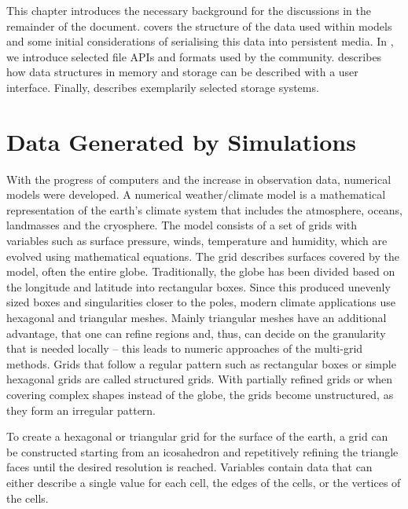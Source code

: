 \begin{chapterIntro}
This chapter introduces the necessary background for the discussions in the remainder of the document.
 covers the structure of the data used within models and some initial considerations of serialising this data into persistent media.
In , we introduce selected file APIs and formats used by the community.
 describes how data structures in memory and storage can be described with a user interface. %
Finally,  describes exemplarily selected storage systems.
\end{chapterIntro}


\section{Data Generated by Simulations}
\label{sec: Data Generated by Simulations}

With the progress of computers and the increase in observation data, numerical models were developed.
A numerical weather/climate model is a mathematical representation of the earth's climate system that includes the atmosphere, oceans, landmasses and the cryosphere.
The model consists of a set of grids with variables such as surface pressure, winds, temperature and humidity, which are evolved using mathematical equations.
The grid describes surfaces covered by the model,  often the entire globe.
Traditionally, the globe has been divided based on the longitude and latitude into rectangular boxes.
Since this produced unevenly sized boxes and singularities closer to the poles, modern climate applications use hexagonal and triangular meshes.
Mainly triangular meshes have an additional advantage, that one can refine regions and, thus, can decide on the granularity that is needed locally -- this leads to numeric approaches of the multi-grid methods.
Grids that follow a regular pattern such as rectangular boxes or simple hexagonal grids are called structured grids.
With partially refined grids or when covering complex shapes instead of the globe, the grids become unstructured, as they form an irregular pattern.

To create a hexagonal or triangular grid for the surface of the earth, a grid can be constructed starting from an icosahedron and repetitively refining the triangle faces until the desired resolution is reached.
Variables contain data that can either describe a single value for each cell, the edges of the cells, or the vertices of the cells.

